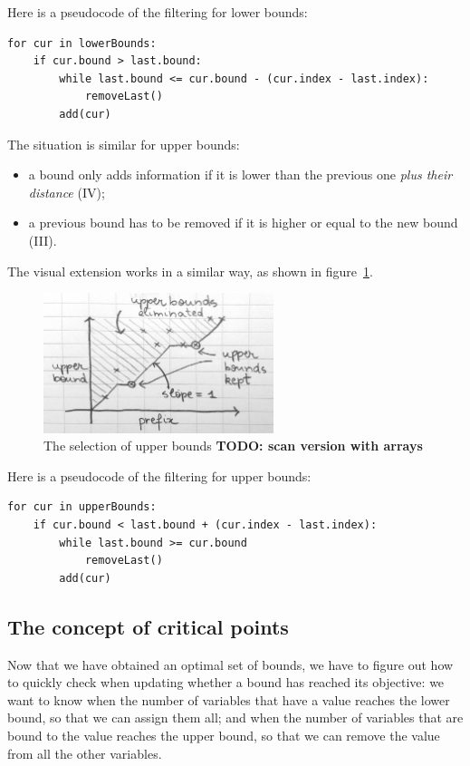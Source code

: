 \documentclass[a4paper,10pt]{article}
\begin{document}
Here is a pseudocode of the filtering for lower bounds:
\begin{lstlisting}
for cur in lowerBounds:
    if cur.bound > last.bound:
        while last.bound <= cur.bound - (cur.index - last.index):
            removeLast()
        add(cur)
\end{lstlisting}

The situation is similar for upper bounds:
\begin{itemize}
    \item a bound only adds information if it is lower than the previous one \emph{plus their distance} (IV);
    \item a previous bound has to be removed if it is higher or equal to the new bound (III).
\end{itemize}

The visual extension works in a similar way, as shown in figure~\ref{fig:upper-bounds}.

\begin{figure}[h!]
    \centering
    \includegraphics[width=0.6\textwidth]{img/upper-bounds}
    \caption{The selection of upper bounds \textbf{TODO: scan version with arrays}}
    \label{fig:upper-bounds}
\end{figure}

Here is a pseudocode of the filtering for upper bounds:
\begin{lstlisting}
for cur in upperBounds:
    if cur.bound < last.bound + (cur.index - last.index):
        while last.bound >= cur.bound
            removeLast()
        add(cur)
\end{lstlisting}

\subsection{The concept of critical points}
\label{subsec:critical}

Now that we have obtained an optimal set of bounds, we have to figure out how to quickly check when updating whether a bound has reached its objective: we want to know when the number of variables that have a value reaches the lower bound, so that we can assign them all; and when the number of variables that are bound to the value reaches the upper bound, so that we can remove the value from all the other variables.
\end{document}
